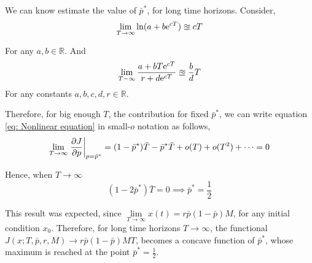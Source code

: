 We can know estimate the value of $\bar{p}^*$, for long time horizons. Consider,  
\begin{equation}	
\lim\limits_{T\rightarrow \infty} \ln(a+b\mathrm{e}^{cT})\approxeq cT
\end{equation}

For any $a,b \in \mathbb{R}$. And
\begin{equation}
	\lim\limits_{T-\infty}\frac{a+bT\mathrm{e}^{cT}}{r+d\mathrm{e}^{cT}} \approxeq \frac{b}{d}T
\end{equation}
For any constants $a,b,c,d,r \in \mathbb{R}$. 

Therefore, for big enough $T$, the contribution for fixed $\bar{p}^*$, we can write equation \ref{eq: Nonlinear equation} in small-$o$ notation as follows,
\begin{equation}
\lim\limits_{T\rightarrow \infty}\left.\frac{\partial J}{{\partial p}}\right|_{p=\bar{p}^*} =(1-\bar{p}^*)\bar{T}-\bar{p}^*\bar{T}+o(T)+o(T^2)+\dots=0 
\end{equation}

Hence, when $T\rightarrow \infty$
\begin{equation}
	(1-2\bar{p}^*)\bar{T}=0\implies \bar{p}^*=\frac{1}{2}
\end{equation}

This result was expected, since 
$\lim\limits_{T\rightarrow\infty} x(t) = r\bar{p}(1-\bar{p})M$, for any initial condition $x_0$. Therefore, for long time horizons $T\rightarrow \infty$, the functional $J(x; T,\bar{p},r,M)\rightarrow r\bar{p}(1-\bar{p})MT$, becomes a concave function of $\bar{p}^*$, whose maximum is reached at the point $\bar{p}^*=\frac{1}{2}$.